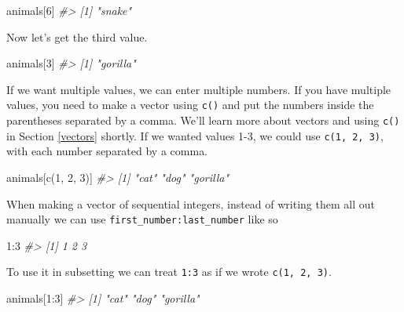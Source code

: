\documentclass[
  12pt,
  openany]{book}
\newenvironment{Shaded}{\begin{snugshade}}{\end{snugshade}}
\newcommand{\CommentTok}[1]{\textcolor[rgb]{0.37,0.37,0.37}{\textit{#1}}}
\newcommand{\DecValTok}[1]{\textcolor[rgb]{0.06,0.06,0.06}{#1}}
\newcommand{\FunctionTok}[1]{\textcolor[rgb]{0,0,0}{#1}}
\newcommand{\NormalTok}[1]{#1}
\newcommand{\SpecialCharTok}[1]{\textcolor[rgb]{0,0,0}{#1}}
\begin{document}
\begin{Shaded}
\begin{Highlighting}[]
\NormalTok{animals[}\DecValTok{6}\NormalTok{]}
\CommentTok{\#\textgreater{} [1] "snake"}
\end{Highlighting}
\end{Shaded}

Now let's get the third value.

\begin{Shaded}
\begin{Highlighting}[]
\NormalTok{animals[}\DecValTok{3}\NormalTok{]}
\CommentTok{\#\textgreater{} [1] "gorilla"}
\end{Highlighting}
\end{Shaded}

If we want multiple values, we can enter multiple numbers. If you have multiple values, you need to make a vector using \texttt{c()} and put the numbers inside the parentheses separated by a comma. We'll learn more about vectors and using \texttt{c()} in Section \ref{vectors} shortly. If we wanted values 1-3, we could use \texttt{c(1,\ 2,\ 3)}, with each number separated by a comma.

\begin{Shaded}
\begin{Highlighting}[]
\NormalTok{animals[}\FunctionTok{c}\NormalTok{(}\DecValTok{1}\NormalTok{, }\DecValTok{2}\NormalTok{, }\DecValTok{3}\NormalTok{)]}
\CommentTok{\#\textgreater{} [1] "cat"     "dog"     "gorilla"}
\end{Highlighting}
\end{Shaded}

When making a vector of sequential integers, instead of writing them all out manually we can use \texttt{first\_number:last\_number} like so

\begin{Shaded}
\begin{Highlighting}[]
\DecValTok{1}\SpecialCharTok{:}\DecValTok{3}
\CommentTok{\#\textgreater{} [1] 1 2 3}
\end{Highlighting}
\end{Shaded}

To use it in subsetting we can treat \texttt{1:3} as if we wrote \texttt{c(1,\ 2,\ 3)}.

\begin{Shaded}
\begin{Highlighting}[]
\NormalTok{animals[}\DecValTok{1}\SpecialCharTok{:}\DecValTok{3}\NormalTok{]}
\CommentTok{\#\textgreater{} [1] "cat"     "dog"     "gorilla"}
\end{Highlighting}
\end{Shaded}
\end{document}
